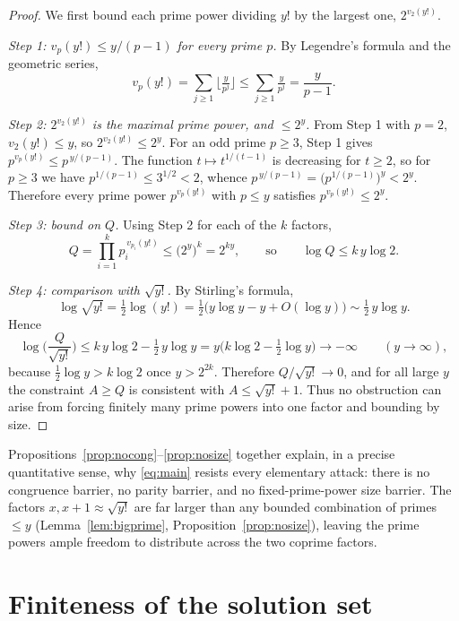 \documentclass{amsart}
\theoremstyle{plain}
\theoremstyle{remark}
\begin{document}
\begin{proof}
We first bound each prime power dividing $y!$ by the largest one, $2^{v_2(y!)}$.

\emph{Step 1: $v_p(y!)\le y/(p-1)$ for every prime $p$.} By Legendre's
formula and the geometric series,
\[
   v_p(y!)=\sum_{j\ge1}\Big\lfloor \tfrac{y}{p^j}\Big\rfloor
   \le\sum_{j\ge1}\tfrac{y}{p^j}=\frac{y}{p-1}.
\]

\emph{Step 2: $2^{v_2(y!)}$ is the maximal prime power, and $\le 2^{y}$.}
From Step 1 with $p=2$, $v_2(y!)\le y$, so $2^{v_2(y!)}\le 2^{y}$. For an
odd prime $p\ge3$, Step 1 gives $p^{v_p(y!)}\le p^{\,y/(p-1)}$. The function
$t\mapsto t^{1/(t-1)}$ is decreasing for $t\ge2$, so for $p\ge3$ we have
$p^{1/(p-1)}\le 3^{1/2}<2$, whence
$p^{\,y/(p-1)}=\bigl(p^{1/(p-1)}\bigr)^{y}<2^{y}$. Therefore every prime
power $p^{v_p(y!)}$ with $p\le y$ satisfies $p^{v_p(y!)}\le 2^{y}$.

\emph{Step 3: bound on $Q$.} Using Step 2 for each of the $k$ factors,
\[
   Q=\prod_{i=1}^{k}p_i^{\,v_{p_i}(y!)}\le\bigl(2^{y}\bigr)^{k}=2^{ky},
   \qquad\text{so}\qquad \log Q\le k\,y\log 2 .
\]

\emph{Step 4: comparison with $\sqrt{y!}$.} By Stirling's formula,
\[
   \log\sqrt{y!}=\tfrac12\log(y!)
   =\tfrac12\bigl(y\log y-y+O(\log y)\bigr)\sim\tfrac12\,y\log y .
\]
Hence
\[
   \log\!\Big(\frac{Q}{\sqrt{y!}}\Big)\le k\,y\log 2-\tfrac12\,y\log y
   = y\Big(k\log 2-\tfrac12\log y\Big)\longrightarrow-\infty
   \qquad(y\to\infty),
\]
because $\tfrac12\log y>k\log 2$ once $y>2^{2k}$. Therefore
$Q/\sqrt{y!}\to0$, and for all large $y$ the constraint $A\ge Q$ is
consistent with $A\le\sqrt{y!}+1$. Thus no obstruction can arise from
forcing finitely many prime powers into one factor and bounding by size.
\end{proof}

Propositions~\ref{prop:nocong}--\ref{prop:nosize} together explain, in a
precise quantitative sense, why \eqref{eq:main} resists every elementary
attack: there is no congruence barrier, no parity barrier, and no
fixed-prime-power size barrier. The factors $x,x+1\approx\sqrt{y!}$ are far
larger than any bounded combination of primes $\le y$
(Lemma~\ref{lem:bigprime}, Proposition~\ref{prop:nosize}), leaving the prime
powers ample freedom to distribute across the two coprime factors.

\section{Finiteness of the solution set}\label{sec:finite}
\end{document}
